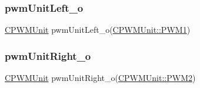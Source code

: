 \subsubsection{\texorpdfstring{pwmUnitLeft\_o}{pwmUnitLeft\_o}}
{\footnotesize\ttfamily \mbox{\hyperlink{class_c_p_w_m_unit}{C\+P\+W\+M\+Unit}} pwm\+Unit\+Left\+\_\+o(\mbox{\hyperlink{class_c_p_w_m_unit_ad3e55d1df0367d8a090d4b835704be44a3f6167a7882e80f1ad05c8bff5e538c0}{C\+P\+W\+M\+Unit\+::\+P\+W\+M1}})}

\mbox{\label{_a_d_a_s___m_c_u_8ino_a49af1ef8724d9cb785e37641bb0cdc6b}} 
\subsubsection{\texorpdfstring{pwmUnitRight\_o}{pwmUnitRight\_o}}
{\footnotesize\ttfamily \mbox{\hyperlink{class_c_p_w_m_unit}{C\+P\+W\+M\+Unit}} pwm\+Unit\+Right\+\_\+o(\mbox{\hyperlink{class_c_p_w_m_unit_ad3e55d1df0367d8a090d4b835704be44afc7888ea63be5da5551d10db3d676185}{C\+P\+W\+M\+Unit\+::\+P\+W\+M2}})}

